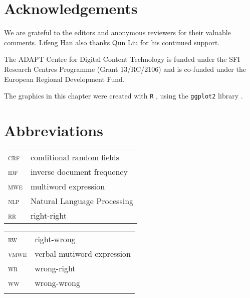 \documentclass[output=paper,modfonts,nonflat]{langsci/langscibook}
\begin{document}
\section*{Acknowledgements}

We are grateful to the editors and anonymous reviewers for their valuable comments. Lifeng Han also thanks Qun Liu for his continued support. 

The ADAPT Centre for Digital Content Technology is funded under the SFI Research Centres Programme (Grant 13/RC/2106) and is co-funded under the European Regional Development Fund.



The graphics in this chapter were created with \texttt{R} \citep{R}, using the \texttt{ggplot2} library \citep{ggplot2}.


\section*{Abbreviations}

   \begin{tabularx}{.48\textwidth}{ll}
    \textsc{crf} & conditional random fields\\
   \textsc{idf}  & inverse document frequency\\  \textsc{mwe}  & multiword expression\\
  \textsc{nlp}  & Natural Language Processing\\
 \textsc{rr}  & right-right\\
      \end{tabularx}
      \begin{tabularx}{.48\textwidth}{ll}
 \textsc{rw}  & right-wrong\\
   \textsc{vmwe}  & verbal mutiword expression\\  \textsc{wr}  & wrong-right\\
  \textsc{ww}  & wrong-wrong\\
  \\
  \end{tabularx}


{\sloppy
\printbibliography[heading=subbibliography,notkeyword=this]
}

\clearpage
\end{document}
